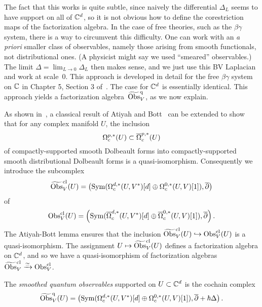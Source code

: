 The fact that this works is quite subtle, since naively the differential $\Delta_L$ seems to have support on all of $\CC^d$, so it is not obvious how to define the corestriction maps of the factorization algebra. 
In the case of free theories, such as the $\beta\gamma$ system, there is a way to circumvent this difficulty. 
One can work with an {\it a priori} smaller class of observables, namely those arising from smooth functionals, not distributional ones.
(A physicist might say we used ``smeared'' observables.)
The limit $\Delta = \lim_{L \to 0} \Delta_L$ then makes sense, and we just use this BV Laplacian and work at scale~0. 
This approach is developed in detail for the free $\beta\gamma$ system on $\CC$ in Chapter 5, Section 3 of~\cite{CG1}. 
The case for $\CC^d$ is essentially identical. 
This approach yields a factorization algebra~$\Tilde{\Obs}^\q_V$, as we now explain.

As shown in~\cite{CG1},
a classical result of Atiyah and Bott~\cite{AB} can be extended to show that for any complex manifold $U$, 
the inclusion
\[
\Omega^{p,*}_c(U) \subset \Bar{\Omega}^{p,*}_c(U)
\]
of compactly-supported smooth Dolbeault forms into compactly-supported smooth distributional Dolbeault forms is a quasi-isomorphism. 
Consequently we introduce the subcomplex 
\[
\Tilde{\Obs}^{\cl}_V(U) =  \left(\Sym(\Omega^{d,*}_c(U,V^*)[d] \oplus \Omega^{0,*}_c(U,V)[1]), \dbar\right)
\]
of 
\[
\Obs_V^{\cl}(U) = \left(\Sym(\Bar{\Omega}^{d,*}_c(U,V^*)[d] \oplus \Bar{\Omega}^{0,*}_c(U,V)[1]), \dbar \right).
\]
The Atiyah-Bott lemma ensures that the inclusion $\Tilde{\Obs}^{\cl}_V(U) \hookrightarrow \Obs_V^{\cl}(U)$ is a quasi-isomorphism.
The assignment $U \mapsto \Tilde{\Obs}^{\cl}_V(U)$ defines a factorization algebra on $\CC^d$, 
and so we have a quasi-isomorphism of factorization algebras $\Tilde{\Obs}^{\cl}_V \xto{\simeq} \Obs^{\cl}_V$.


\begin{dfn}\label{dfn: qobs}
The {\em smoothed quantum observables} supported on $U \subset \CC^d$ is the cochain complex
\[
\Tilde{\Obs}^\q_V(U) = \left(\Sym(\Omega^{d,*}_c(U,V^*)[d] \oplus \Omega^{0,*}_c(U,V)[1]), \dbar + \hbar \Delta\right) .
\]
\end{dfn}

